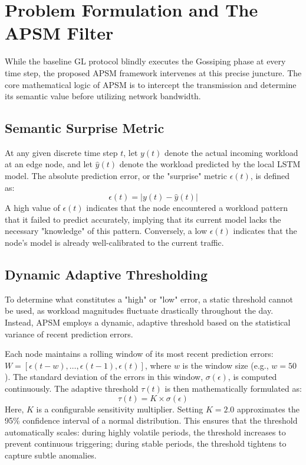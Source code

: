 \section{Problem Formulation and The APSM Filter}
While the baseline GL protocol blindly executes the Gossiping phase at every time step, the proposed APSM framework intervenes at this precise juncture. The core mathematical logic of APSM is to intercept the transmission and determine its semantic value before utilizing network bandwidth.

\subsection{Semantic Surprise Metric}
At any given discrete time step $t$, let $y(t)$ denote the actual incoming workload at an edge node, and let $\hat{y}(t)$ denote the workload predicted by the local LSTM model. The absolute prediction error, or the "surprise" metric $\epsilon(t)$, is defined as:
\begin{equation}
    \epsilon(t) = | y(t) - \hat{y}(t) |
\end{equation}
A high value of $\epsilon(t)$ indicates that the node encountered a workload pattern that it failed to predict accurately, implying that its current model lacks the necessary "knowledge" of this pattern. Conversely, a low $\epsilon(t)$ indicates that the node's model is already well-calibrated to the current traffic.

\subsection{Dynamic Adaptive Thresholding}
To determine what constitutes a "high" or "low" error, a static threshold cannot be used, as workload magnitudes fluctuate drastically throughout the day. Instead, APSM employs a dynamic, adaptive threshold based on the statistical variance of recent prediction errors.

Each node maintains a rolling window of its most recent prediction errors: $W = [\epsilon(t-w), \dots, \epsilon(t-1), \epsilon(t)]$, where $w$ is the window size (e.g., $w = 50$). 
The standard deviation of the errors in this window, $\sigma(\epsilon)$, is computed continuously. The adaptive threshold $\tau(t)$ is then mathematically formulated as:
\begin{equation}
    \tau(t) = K \times \sigma(\epsilon)
\end{equation}
Here, $K$ is a configurable sensitivity multiplier. Setting $K = 2.0$ approximates the 95\% confidence interval of a normal distribution. This ensures that the threshold automatically scales: during highly volatile periods, the threshold increases to prevent continuous triggering; during stable periods, the threshold tightens to capture subtle anomalies.

